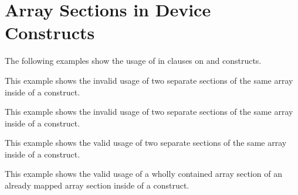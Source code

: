 \pagebreak
\section{Array Sections in Device Constructs}
\label{sec:array_sections}

The following examples show the usage of  in  clauses 
on  and  constructs.

This example shows the invalid usage of two separate sections of the same array 
inside of a  construct.



\pagebreak
This example shows the invalid usage of two separate sections of the same array 
inside of a  construct.



\pagebreak
This example shows the valid usage of two separate sections of the same array inside 
of a  construct.



\pagebreak
This example shows the valid usage of a wholly contained array section of an already 
mapped array section inside of a  construct.




